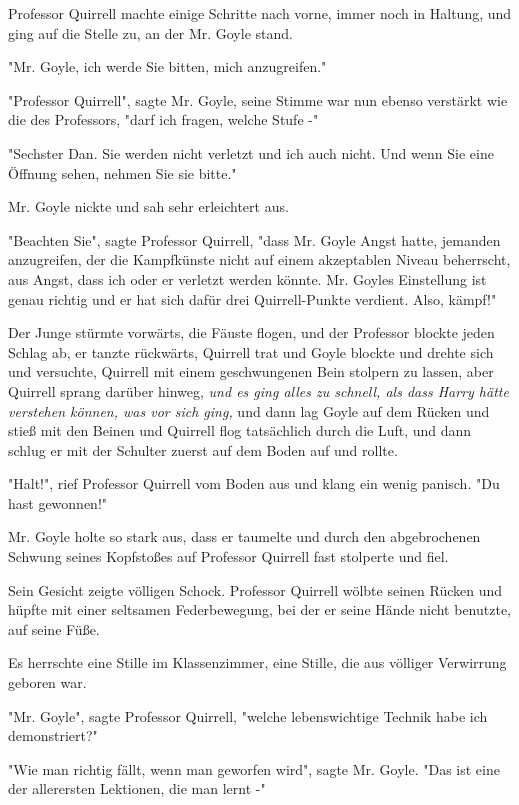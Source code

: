 {Professor Quirrell machte einige Schritte nach vorne, immer noch in Haltung, und ging auf die Stelle zu, an der Mr. Goyle stand.

"Mr. Goyle, ich werde Sie bitten, mich anzugreifen."

"Professor Quirrell", sagte Mr. Goyle, seine Stimme war nun ebenso verstärkt wie die des Professors, "darf ich fragen, welche Stufe -"

"Sechster Dan. Sie werden nicht verletzt und ich auch nicht. Und wenn Sie eine Öffnung sehen, nehmen Sie sie bitte."

Mr. Goyle nickte und sah sehr erleichtert aus.

"Beachten Sie", sagte Professor Quirrell, "dass Mr. Goyle Angst hatte, jemanden anzugreifen, der die Kampfkünste nicht auf einem akzeptablen Niveau beherrscht, aus Angst, dass ich oder er verletzt werden könnte. Mr. Goyles Einstellung ist genau richtig und er hat sich dafür drei Quirrell-Punkte verdient. Also, kämpf!"

Der Junge stürmte vorwärts, die Fäuste flogen, und der Professor blockte jeden Schlag ab, er tanzte rückwärts, Quirrell trat und Goyle blockte und drehte sich und versuchte, Quirrell mit einem geschwungenen Bein stolpern zu lassen, aber Quirrell sprang darüber hinweg, \emph{und es ging alles zu schnell, als dass Harry hätte verstehen können, was vor sich ging,} und dann lag Goyle auf dem Rücken und stieß mit den Beinen und Quirrell flog tatsächlich durch die Luft, und dann schlug er mit der Schulter zuerst auf dem Boden auf und rollte.

"Halt!", rief Professor Quirrell vom Boden aus und klang ein wenig panisch. "Du hast gewonnen!"

Mr. Goyle holte so stark aus, dass er taumelte und durch den abgebrochenen Schwung seines Kopfstoßes auf Professor Quirrell fast stolperte und fiel.

Sein Gesicht zeigte völligen Schock. Professor Quirrell wölbte seinen Rücken und hüpfte mit einer seltsamen Federbewegung, bei der er seine Hände nicht benutzte, auf seine Füße.

Es herrschte eine Stille im Klassenzimmer, eine Stille, die aus völliger Verwirrung geboren war.

"Mr. Goyle", sagte Professor Quirrell, "welche lebenswichtige Technik habe ich demonstriert?"

"Wie man richtig fällt, wenn man geworfen wird", sagte Mr. Goyle. "Das ist eine der allerersten Lektionen, die man lernt -"

}

